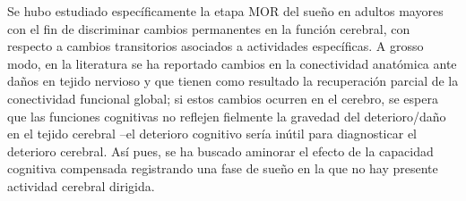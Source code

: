 Se hubo estudiado espec\'ificamente la etapa MOR del sue\~no en adultos mayores
con el fin de discriminar
cambios permanentes en la funci\'on cerebral, con respecto a cambios transitorios asociados
a actividades espec\'ificas.
A grosso modo, en la literatura se ha reportado cambios en la conectividad anat\'omica
ante da\~nos en tejido nervioso y que tienen como resultado la recuperaci\'on parcial
de la conectividad funcional global; si estos cambios ocurren en el cerebro, se espera que las
funciones cognitivas no reflejen fielmente la gravedad del deterioro/da\~no en el tejido cerebral
--el deterioro cognitivo ser\'ia in\'util para diagnosticar el deterioro cerebral.
As\'i pues, se ha buscado aminorar el efecto de la capacidad cognitiva compensada
registrando una fase de sue\~no en la que no hay presente actividad cerebral 
dirigida.


